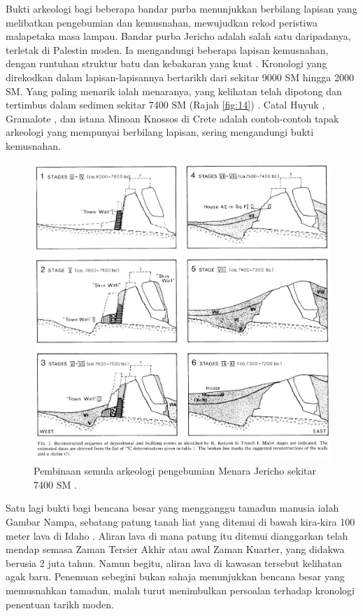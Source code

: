 \documentclass[10pt,twocolumn,letterpaper]{article}
\begin{document}
Bukti arkeologi bagi beberapa bandar purba menunjukkan berbilang lapisan yang melibatkan pengebumian dan kemusnahan, mewujudkan rekod peristiwa malapetaka masa lampau. Bandar purba Jericho adalah salah satu daripadanya, terletak di Palestin moden. Ia mengandungi beberapa lapisan kemusnahan, dengan runtuhan struktur batu dan kebakaran yang kuat \cite{96,97}. Kronologi yang direkodkan dalam lapisan-lapisannya bertarikh dari sekitar 9000 SM hingga 2000 SM. Yang paling menarik ialah menaranya, yang kelihatan telah dipotong dan tertimbus dalam sedimen sekitar 7400 SM (Rajah \ref{fig:14}) \cite{95}. Catal Huyuk \cite{99}, Gramalote \cite{98}, dan istana Minoan Knossos di Crete \cite{100,101} adalah contoh-contoh tapak arkeologi yang mempunyai berbilang lapisan, sering mengandungi bukti kemusnahan.

\begin{figure}[t]
\begin{center}

\includegraphics[width=1\linewidth]{jericho.jpg}
\end{center}
   \caption{Pembinaan semula arkeologi pengebumian Menara Jericho sekitar 7400 SM \cite{95}.}
\label{fig:14}
\label{fig:onecol}
\end{figure}

Satu lagi bukti bagi bencana besar yang mengganggu tamadun manusia ialah Gambar Nampa, sebatang patung tanah liat yang ditemui di bawah kira-kira 100 meter lava di Idaho \cite{102,103}. Aliran lava di mana patung itu ditemui dianggarkan telah mendap semasa Zaman Tersier Akhir atau awal Zaman Kuarter, yang didakwa berusia 2 juta tahun. Namun begitu, aliran lava di kawasan tersebut kelihatan agak baru. Penemuan sebegini bukan sahaja menunjukkan bencana besar yang memusnahkan tamadun, malah turut menimbulkan persoalan terhadap kronologi penentuan tarikh moden.
\end{document}
